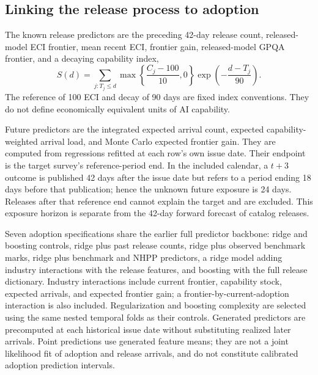 \subsection{Linking the release process to adoption}
The known release predictors are the preceding 42-day release count, released-model ECI frontier, mean recent ECI, frontier gain, released-model GPQA frontier, and a decaying capability index,
\begin{equation}
 S(d)=\sum_{j:T_j\le d}\max\!\left\{\frac{C_j-100}{10},0\right\}
          \exp\!\left(-\frac{d-T_j}{90}\right).
\end{equation}
The reference of 100 ECI and decay of 90 days are fixed index conventions. They do not define economically equivalent units of AI capability.

Future predictors are the integrated expected arrival count, expected capability-weighted arrival load, and Monte Carlo expected frontier gain. They are computed from regressions refitted at each row's own issue date. Their endpoint is the target survey's reference-period end. In the included calendar, a $t+3$ outcome is published 42 days after the issue date but refers to a period ending 18 days before that publication; hence the unknown future exposure is 24 days. Releases after that reference end cannot explain the target and are excluded. This exposure horizon is separate from the 42-day forward forecast of catalog releases.

Seven adoption specifications share the earlier full predictor backbone: ridge and boosting controls, ridge plus past release counts, ridge plus observed benchmark marks, ridge plus benchmark and NHPP predictors, a ridge model adding industry interactions with the release features, and boosting with the full release dictionary. Industry interactions include current frontier, capability stock, expected arrivals, and expected frontier gain; a frontier-by-current-adoption interaction is also included. Regularization and boosting complexity are selected using the same nested temporal folds as their controls. Generated predictors are precomputed at each historical issue date without substituting realized later arrivals. Point predictions use generated feature means; they are not a joint likelihood fit of adoption and release arrivals, and do not constitute calibrated adoption prediction intervals.
